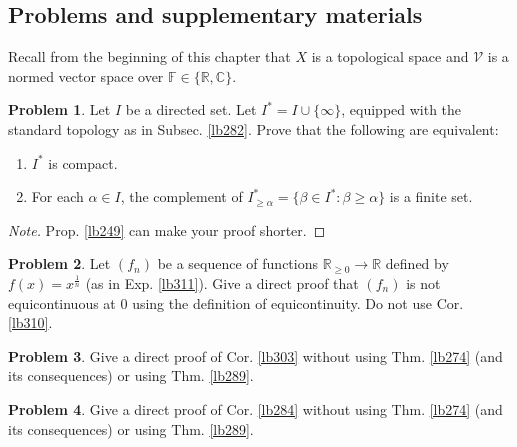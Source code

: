 \documentclass[12pt,b5paper,notitlepage]{article}
\theoremstyle{definition}
\newtheorem{prob}{\color{red}Problem}[section]
\theoremstyle{plain}
\newcommand{\mc}{\mathcal}
\newcommand{\Cbb}{\mathbb C}
\newcommand{\Rbb}{\mathbb R}
\newcommand{\Fbb}{\mathbb F}
\numberwithin{equation}{section}
\begin{document}





















\subsection{Problems and supplementary materials}


Recall from the beginning of this chapter that $X$ is a topological space and $\mc V$ is a normed vector space over $\Fbb\in\{\Rbb,\Cbb\}$.

\begin{prob}\label{lb283}
Let $I$ be a directed set. Let $I^*=I\cup\{\infty\}$, equipped with the standard topology as in Subsec. \ref{lb282}. Prove that the following are equivalent:
\begin{enumerate}[label=(\arabic*)]
\item $I^*$ is compact.
\item For each $\alpha\in I$, the complement of $I^*_{\geq\alpha}=\{\beta\in I^*:\beta\geq\alpha\}$ is a finite set.
\end{enumerate}
\end{prob}


\begin{proof}[Note]
Prop. \ref{lb249} can make your proof shorter.
\end{proof}


\begin{prob}
Let $(f_n)$ be a sequence of functions $\Rbb_{\geq0}\rightarrow\Rbb$ defined by $f(x)=x^{\frac 1n}$ (as in Exp. \ref{lb311}). Give a direct proof that $(f_n)$ is not equicontinuous at $0$ using the definition of equicontinuity. Do not use Cor. \ref{lb310}.
\end{prob}


\begin{prob}
Give a direct proof of Cor. \ref{lb303} without using Thm. \ref{lb274} (and its consequences) or using Thm. \ref{lb289}.
\end{prob}

\begin{prob}
Give a direct proof of Cor. \ref{lb284} without using Thm. \ref{lb274} (and its consequences) or using Thm. \ref{lb289}.
\end{prob}
\end{document}
